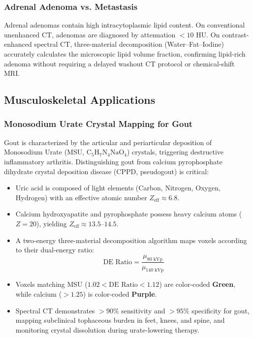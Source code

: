 \documentclass[11pt,a4paper]{article}
\begin{document}
\subsubsection{Adrenal Adenoma vs. Metastasis}
Adrenal adenomas contain high intracytoplasmic lipid content. On conventional unenhanced CT, adenomas are diagnosed by attenuation $< 10\text{ HU}$. On contrast-enhanced spectral CT, three-material decomposition (Water--Fat--Iodine) accurately calculates the microscopic lipid volume fraction, confirming lipid-rich adenoma without requiring a delayed washout CT protocol or chemical-shift MRI.

\subsection{Musculoskeletal Applications}

\subsubsection{Monosodium Urate Crystal Mapping for Gout}
Gout is characterized by the articular and periarticular deposition of Monosodium Urate (MSU, $\text{C}_5\text{H}_7\text{N}_4\text{NaO}_4$) crystals, triggering destructive inflammatory arthritis. Distinguishing gout from calcium pyrophosphate dihydrate crystal deposition disease (CPPD, pseudogout) is critical:
\begin{itemize}[leftmargin=2em]
    \item Uric acid is composed of light elements (Carbon, Nitrogen, Oxygen, Hydrogen) with an effective atomic number \textbf{$Z_{\text{eff}} \approx 6.8$}.
    \item Calcium hydroxyapatite and pyrophosphate possess heavy calcium atoms ($Z = 20$), yielding \textbf{$Z_{\text{eff}} \approx 13.5\text{--}14.5$}.
    \item A two-energy three-material decomposition algorithm maps voxels according to their dual-energy ratio:
\begin{equation}
    \text{DE Ratio} = \frac{\mu_{80\text{ kVp}}}{\mu_{140\text{ kVp}}}
\end{equation}
    \item Voxels matching MSU ($1.02 < \text{DE Ratio} < 1.12$) are color-coded \textbf{Green}, while calcium ($> 1.25$) is color-coded \textbf{Purple}.
    \item Spectral CT demonstrates $> 90\%$ sensitivity and $> 95\%$ specificity for gout, mapping subclinical tophaceous burden in feet, knees, and spine, and monitoring crystal dissolution during urate-lowering therapy.
\end{itemize}
\end{document}
